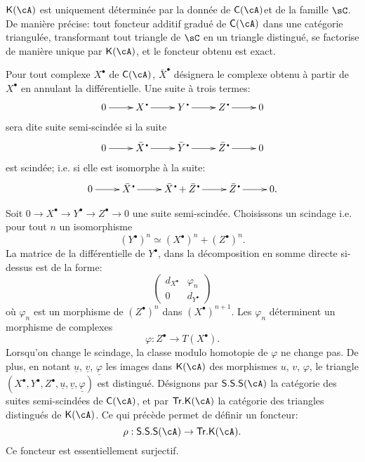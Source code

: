 \subsubsection{}\label{VIII:1-2-4}

$\eK(\cA)$ est uniquement d\'etermin\'ee par la donn\'ee de $\eC(\cA)$et de la 
famille $\sC$. De mani\`ere pr\'ecise: tout foncteur additif gradu\'e de 
$\eC(\cA)$ dans une cat\'egorie triangul\'ee, transformant tout triangle de 
$\sC$ en un triangle distingu\'e, se factorise de mani\`ere unique par 
$\eK(\cA)$, et le foncteur obtenu est exact. 

Pour tout complexe $X^\bullet$ de $\eC(\cA)$, $\bar X^\bullet$ d\'esignera le 
complexe obtenu \`a partir de $X^\bullet$ en annulant la diff\'erentielle. Une 
suite \`a trois termes: 
\[\xymatrix{
  0 \ar[r] 
    & X^\bullet \ar[r] 
    & Y^\bullet \ar[r] 
    & Z^\bullet \ar[r] 
    & 0 
}\]
sera dite suite semi-scind\'ee si la suite 
\[\xymatrix{
  0 \ar[r] 
    & \bar X^\bullet \ar[r] 
    & \bar Y^\bullet \ar[r] 
    & \bar Z^\bullet \ar[r] 
    & 0 
}\]
est scind\'ee; i.e. si elle est isomorphe \`a la suite: 
\[\xymatrix{
  0 \ar[r] 
    & \bar X^\bullet \ar[r] 
    & \bar X^\bullet + \bar Z^\bullet \ar[r] 
    & \bar Z^\bullet \ar[r] 
    & 0 \text{.}
}\]

Soit $0 \to X^\bullet \to Y^\bullet \to Z^\bullet \to 0$ une suite 
semi-scind\'ee. Choisissons un scindage i.e. pour tout $n$ un isomorphisme 
\[
  (Y^\bullet)^n \simeq (X^\bullet)^n + (Z^\bullet)^n \text{.}
\]
La matrice de la diff\'erentielle de $Y^\bullet$, dans la d\'ecomposition en 
somme directe si-dessus est de la forme: 
\[
  \begin{pmatrix}
    d_{X^\bullet} & \varphi_n \\
    0 & d_{Y^\bullet} 
  \end{pmatrix}
\]
o\`u $\varphi_n$ est un morphisme de $(Z^\bullet)^n$ dans 
$(X^\bullet)^{n+1}$. Les $\varphi_n$ d\'eterminent un morphisme de complexes 
\[
  \varphi:Z^\bullet \to T(X^\bullet) \text{.}
\]
Lorsqu'on change le scindage, la classe modulo homotopie de $\varphi$ ne 
change pas. De plus, en notant $\underline u$, $\underline v$, 
$\underline\varphi$ les images dans $\eK(\cA)$ des morphismes $u$, $v$, 
$\varphi$, le triangle 
$(X^\bullet,Y^\bullet,Z^\bullet,\underline u,\underline v,\underline\varphi)$ 
est distingu\'e. D\'esignons par $\mathsf{S.S.S}(\cA)$ la cat\'egorie des 
suites semi-scind\'ees de $\eC(\cA)$, et par $\mathsf{Tr.K}(\cA)$ la 
cat\'egorie des triangles distingu\'es de $\eK(\cA)$. Ce qui pr\'ec\`ede 
permet de d\'efinir un foncteur: 
\[
  \rho:\mathsf{S.S.S}(\cA) \to \mathsf{Tr.K}(\cA) \text{.}
\]
Ce foncteur est essentiellement surjectif. 










